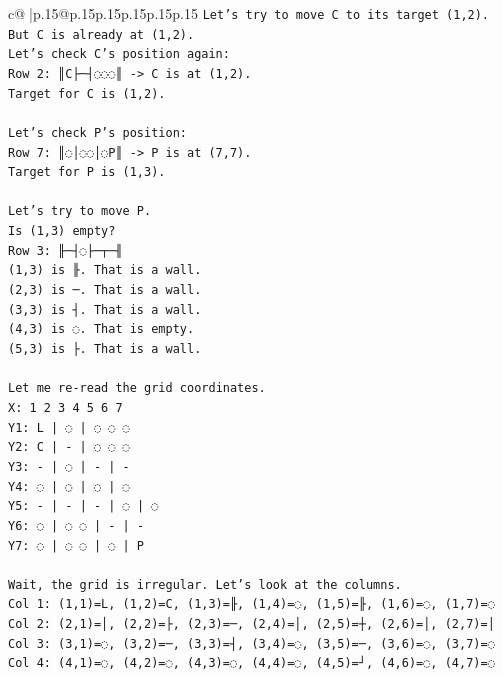 \documentclass{article}
\begin{document}
{\begin{supertabular}{c@{$\;$}|p{.15\linewidth}@{}p{.15\linewidth}p{.15\linewidth}p{.15\linewidth}p{.15\linewidth}p{.15\linewidth}}
{{{\texttt{Let's try to move C to its target (1,2). But C is already at (1,2).} \\
\texttt{Let's check C's position again:} \\
\texttt{Row 2: ║C├─┤◌◌◌║ {-}> C is at (1,2).} \\
\texttt{Target for C is (1,2).} \\
\\ 
\texttt{Let's check P's position:} \\
\texttt{Row 7: ║◌│◌◌│◌P║ {-}> P is at (7,7).} \\
\texttt{Target for P is (1,3).} \\
\\ 
\texttt{Let's try to move P.} \\
\texttt{Is (1,3) empty?} \\
\texttt{Row 3: ╟─┤◌├─┬─╢} \\
\texttt{(1,3) is ╟. That is a wall.} \\
\texttt{(2,3) is ─. That is a wall.} \\
\texttt{(3,3) is ┤. That is a wall.} \\
\texttt{(4,3) is ◌. That is empty.} \\
\texttt{(5,3) is ├. That is a wall.} \\
\\ 
\texttt{Let me re{-}read the grid coordinates.} \\
\texttt{X: 1 2 3 4 5 6 7} \\
\texttt{Y1: L | ◌ | ◌ ◌ ◌} \\
\texttt{Y2: C | {-} | ◌ ◌ ◌} \\
\texttt{Y3: {-} | ◌ | {-} | {-}} \\
\texttt{Y4: ◌ | ◌ | ◌ | ◌} \\
\texttt{Y5: {-} | {-} | {-} | ◌ | ◌} \\
\texttt{Y6: ◌ | ◌ ◌ | {-} | {-}} \\
\texttt{Y7: ◌ | ◌ ◌ | ◌ | P} \\
\\ 
\texttt{Wait, the grid is irregular. Let's look at the columns.} \\
\texttt{Col 1: (1,1)=L, (1,2)=C, (1,3)=╟, (1,4)=◌, (1,5)=╟, (1,6)=◌, (1,7)=◌} \\
\texttt{Col 2: (2,1)=│, (2,2)=├, (2,3)=─, (2,4)=│, (2,5)=┼, (2,6)=│, (2,7)=│} \\
\texttt{Col 3: (3,1)=◌, (3,2)=─, (3,3)=┤, (3,4)=◌, (3,5)=─, (3,6)=◌, (3,7)=◌} \\
\texttt{Col 4: (4,1)=◌, (4,2)=◌, (4,3)=◌, (4,4)=◌, (4,5)=┘, (4,6)=◌, (4,7)=◌} \\
}}}
\end{supertabular}}
\end{document}
